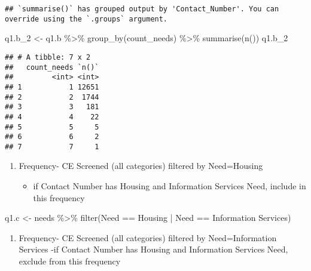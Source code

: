 \documentclass[
]{article}
\newenvironment{Shaded}{\begin{snugshade}}{\end{snugshade}}
\newcommand{\FunctionTok}[1]{\textcolor[rgb]{0.00,0.00,0.00}{#1}}
\newcommand{\NormalTok}[1]{#1}
\newcommand{\OtherTok}[1]{\textcolor[rgb]{0.56,0.35,0.01}{#1}}
\newcommand{\SpecialCharTok}[1]{\textcolor[rgb]{0.00,0.00,0.00}{#1}}
\newcommand{\StringTok}[1]{\textcolor[rgb]{0.31,0.60,0.02}{#1}}
\providecommand{\tightlist}{%
  \setlength{\itemsep}{0pt}\setlength{\parskip}{0pt}}
\begin{document}
\begin{verbatim}
## `summarise()` has grouped output by 'Contact_Number'. You can override using the `.groups` argument.
\end{verbatim}

\begin{Shaded}
\begin{Highlighting}[]
\NormalTok{q1.b\_2 }\OtherTok{\textless{}{-}}\NormalTok{ q1.b }\SpecialCharTok{\%\textgreater{}\%} \FunctionTok{group\_by}\NormalTok{(count\_needs) }\SpecialCharTok{\%\textgreater{}\%} \FunctionTok{summarise}\NormalTok{(}\FunctionTok{n}\NormalTok{()) }
\NormalTok{q1.b\_2}
\end{Highlighting}
\end{Shaded}

\begin{verbatim}
## # A tibble: 7 x 2
##   count_needs `n()`
##         <int> <int>
## 1           1 12651
## 2           2  1744
## 3           3   181
## 4           4    22
## 5           5     5
## 6           6     2
## 7           7     1
\end{verbatim}

\begin{enumerate}
\def\labelenumi{\alph{enumi}.}
\setcounter{enumi}{2}
\tightlist
\item
  Frequency- CE Screened (all categories) filtered by Need=Housing

  \begin{itemize}
  \tightlist
  \item
    if Contact Number has Housing and Information Services Need, include
    in this frequency
  \end{itemize}
\end{enumerate}

\begin{Shaded}
\begin{Highlighting}[]
\NormalTok{q1.c }\OtherTok{\textless{}{-}}\NormalTok{ needs }\SpecialCharTok{\%\textgreater{}\%} \FunctionTok{filter}\NormalTok{(Need }\SpecialCharTok{==} \StringTok{\textquotesingle{}Housing\textquotesingle{}} \SpecialCharTok{|}\NormalTok{ Need }\SpecialCharTok{==} \StringTok{\textquotesingle{}Information Services\textquotesingle{}}\NormalTok{)}
\end{Highlighting}
\end{Shaded}

\begin{enumerate}
\def\labelenumi{\alph{enumi}.}
\setcounter{enumi}{3}
\tightlist
\item
  Frequency- CE Screened (all categories) filtered by Need=Information
  Services -if Contact Number has Housing and Information Services Need,
  exclude from this frequency
\end{enumerate}
\end{document}
